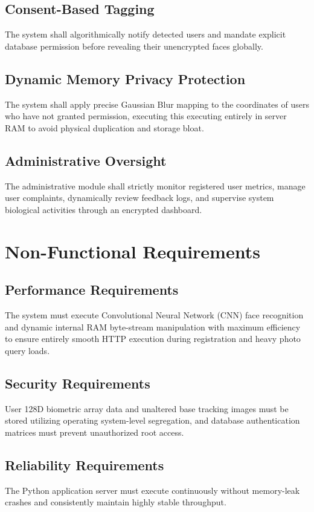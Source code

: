 \subsection{Consent-Based Tagging}
The system shall algorithmically notify detected users and mandate explicit database permission before revealing their unencrypted faces globally.

\subsection{Dynamic Memory Privacy Protection}
The system shall apply precise Gaussian Blur mapping to the coordinates of users who have not granted permission, executing this executing entirely in server RAM to avoid physical duplication and storage bloat.

\subsection{Administrative Oversight}
The administrative module shall strictly monitor registered user metrics, manage user complaints, dynamically review feedback logs, and supervise system biological activities through an encrypted dashboard.

\section{Non-Functional Requirements}

\subsection{Performance Requirements}
The system must execute Convolutional Neural Network (CNN) face recognition and dynamic internal RAM byte-stream manipulation with maximum efficiency to ensure entirely smooth HTTP execution during registration and heavy photo query loads.

\subsection{Security Requirements}
User 128D biometric array data and unaltered base tracking images must be stored utilizing operating system-level segregation, and database authentication matrices must prevent unauthorized root access.

\subsection{Reliability Requirements}
The Python application server must execute continuously without memory-leak crashes and consistently maintain highly stable throughput.

